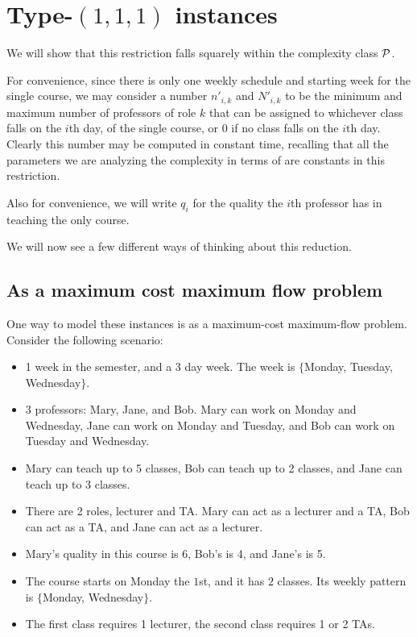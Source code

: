\section{Type-$(1, 1, 1)$ instances}
We will show that this restriction falls squarely within the complexity class $\mathcal{P}$.

For convenience, since there is only one weekly schedule and starting week for the single course, we may consider a number $n'_{i, k}$ and $N'_{i, k}$ to be the minimum and maximum number of professors of role $k$ that can be assigned to whichever class falls on the $i$th day, of the single course, or $0$ if no class falls on the $i$th day. Clearly this number may be computed in constant time, recalling that all the parameters we are analyzing the complexity in terms of are constants in this restriction.

Also for convenience, we will write $q_i$ for the quality the $i$th professor has in teaching the only course.

We will now see a few different ways of thinking about this reduction.
\subsection{As a maximum cost maximum flow problem}

One way to model these instances is as a maximum-cost maximum-flow problem. Consider the following scenario:

\begin{itemize}
  \item 1 week in the semester, and a 3 day week. The week is $\{$Monday, Tuesday, Wednesday$\}$.
  \item 3 professors: Mary, Jane, and Bob. Mary can work on Monday and Wednesday, Jane can work on Monday and Tuesday, and Bob can work on Tuesday and Wednesday.
  \item Mary can teach up to 5 classes, Bob can teach up to 2 classes, and Jane can teach up to 3 classes.
  \item There are 2 roles, lecturer and TA. Mary can act as a lecturer and a TA, Bob can act as a TA, and Jane can act as a lecturer.
  \item Mary's quality in this course is 6, Bob's is 4, and Jane's is 5.
  \item The course starts on Monday the $1$st, and it has $2$ classes. Its weekly pattern is $\{$Monday, Wednesday$\}$.
  \item The first class requires 1 lecturer, the second class requires 1 or 2 TAs.
\end{itemize}

